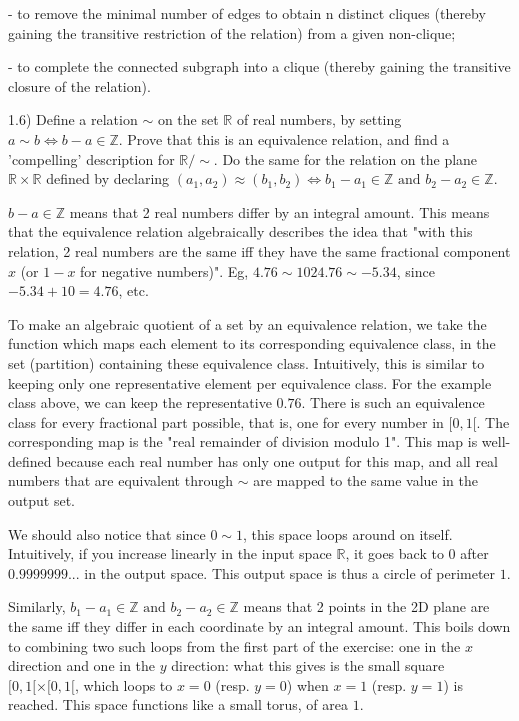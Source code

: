 - to remove the minimal number of edges to obtain n distinct cliques (thereby gaining the transitive restriction of the relation) from a given non-clique;

- to complete the connected subgraph into a clique (thereby gaining the transitive closure of the relation).



1.6) Deﬁne a relation $\sim$ on the set $\mathbb{R}$ of real numbers, by setting $a \sim b \Leftrightarrow b - a \in \mathbb{Z}$. Prove that this is an equivalence relation, and ﬁnd a 'compelling' description for $\mathbb{R}/\sim$. Do the same for the relation \approx on the plane $\mathbb{R} \times \mathbb{R}$ deﬁned by declaring $(a_1, a_2) \approx (b_1, b_2) \Leftrightarrow b_1 - a_1 \in \mathbb{Z} \text{ and } b_2 - a_2 \in \mathbb{Z}$.

$b - a \in \mathbb{Z}$ means that 2 real numbers differ by an integral amount. This means that the equivalence relation algebraically describes the idea that "with this relation, 2 real numbers are the same iff they have the same fractional component $x$ (or $1 - x$ for negative numbers)". Eg, $4.76 \sim 1024.76 \sim -5.34$, since $-5.34 + 10 = 4.76$, etc.

To make an algebraic quotient of a set by an equivalence relation, we take the function which maps each element to its corresponding equivalence class, in the set (partition) containing these equivalence class. Intuitively, this is similar to keeping only one representative element per equivalence class. For the example class above, we can keep the representative $0.76$. There is such an equivalence class for every fractional part possible, that is, one for every number in $[0, 1[$. The corresponding map is the "real remainder of division modulo 1". This map is well-defined because each real number has only one output for this map, and all real numbers that are equivalent through $\sim$ are mapped to the same value in the output set.

We should also notice that since $0 \sim 1$, this space loops around on itself. Intuitively, if you increase linearly in the input space $\mathbb{R}$, it goes back to $0$ after $0.9999999...$ in the output space. This output space is thus a circle of perimeter $1$.

Similarly, $b_1 - a_1 \in \mathbb{Z} \text{ and } b_2 - a_2 \in \mathbb{Z}$ means that 2 points in the 2D plane are the same iff they differ in each coordinate by an integral amount. This boils down to combining two such loops from the first part of the exercise: one in the $x$ direction and one in the $y$ direction: what this gives is the small square $[0, 1[ \times [0, 1[$, which loops to $x = 0$ (resp. $y = 0$) when $x = 1$ (resp. $y = 1$) is reached. This space functions like a small torus, of area $1$.





